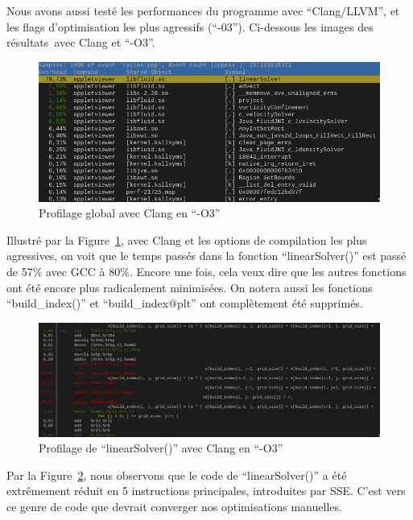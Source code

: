 \documentclass[12pt,a4paper]{article}
\begin{document}
Nous avons aussi testé les performances du programme avec
\enquote{Clang/\ac{LLVM}}, et les flags d’optimisation les plus agressifs
(\enquote{-03}). Ci-dessous les images des résultats avec Clang et \enquote{-O3}.

\begin{figure}
    \centering
    \includegraphics[scale=0.58]{figures/optims/clang-O3/global.png}
    \caption{Profilage global avec Clang en \enquote{-O3}}
    \label{fig.optim.compil.clang.global}
\end{figure}

Illustré par la Figure~\ref{fig.optim.compil.clang.global}, avec Clang et
les options de compilation les plus agressives, on voit que le temps passés dans
la fonction \enquote{linearSolver()} est passé de 57\% avec \ac{GCC} à 80\%.
Encore une fois, cela veux dire que les autres fonctions ont été encore plus
radicalement minimisées. On notera aussi les fonctions \enquote{build\_index()}
et \enquote{build\_index@plt} ont complètement été supprimés.

\begin{figure}
    \centering
    \includegraphics[scale=0.35]{figures/optims/clang-O3/linearSolver.png}
    \caption{Profilage de \enquote{linearSolver()} avec Clang en \enquote{-O3}}
    \label{fig.optim.compil.clang.linearSolver}
\end{figure}

Par la Figure~\ref{fig.optim.compil.clang.linearSolver}, nous observons que le
code de \enquote{linearSolver()} a été extrêmement réduit en 5 instructions
principales, introduites par \ac{SSE}. C’est vers ce genre de code que devrait
converger nos optimisations manuelles.
\end{document}
